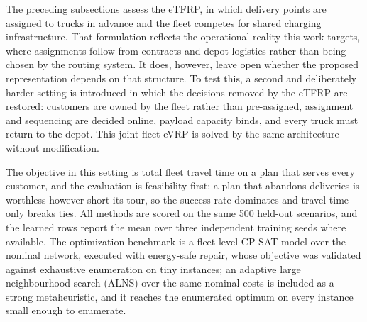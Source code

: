\documentclass[a4paper,fleqn]{cas-sc}
\begin{document}
The preceding subsections assess the eTFRP, in which delivery points are assigned to trucks in advance and the fleet competes for shared charging infrastructure. That formulation reflects the operational reality this work targets, where assignments follow from contracts and depot logistics rather than being chosen by the routing system. It does, however, leave open whether the proposed representation depends on that structure. To test this, a second and deliberately harder setting is introduced in which the decisions removed by the eTFRP are restored: customers are owned by the fleet rather than pre-assigned, assignment and sequencing are decided online, payload capacity binds, and every truck must return to the depot. This joint fleet eVRP is solved by the same architecture without modification.

The objective in this setting is total fleet travel time on a plan that serves every customer, and the evaluation is feasibility-first: a plan that abandons deliveries is worthless however short its tour, so the success rate dominates and travel time only breaks ties. All methods are scored on the same 500 held-out scenarios, and the learned rows report the mean over three independent training seeds where available. The optimization benchmark is a fleet-level CP-SAT model over the nominal network, executed with energy-safe repair, whose objective was validated against exhaustive enumeration on tiny instances; an adaptive large neighbourhood search (ALNS) over the same nominal costs is included as a strong metaheuristic, and it reaches the enumerated optimum on every instance small enough to enumerate.
\end{document}

